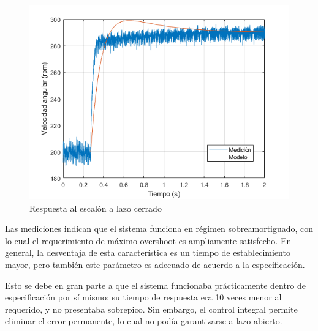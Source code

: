 \documentclass{article}
\begin{document}
\begin{figure}[ht]
	\centering
	\includegraphics[scale=0.75]{imgs/lazocerrado.png}
	\caption{Respuesta al escal\'on a lazo cerrado}
	\label{fig:lazocerrado}
\end{figure}

Las mediciones indican que el sistema funciona en r\'egimen sobreamortiguado, con lo cual el requerimiento de m\'aximo overshoot es ampliamente satisfecho. En general, la desventaja de esta caracter\'istica es un tiempo de establecimiento mayor, pero tambi\'en este par\'ametro es adecuado de acuerdo a la especificaci\'on.

Esto se debe en gran parte a que el sistema funcionaba pr\'acticamente dentro de especificaci\'on por s\'i mismo: su tiempo de respuesta era 10 veces menor al requerido, y no presentaba sobrepico. Sin embargo, el control integral permite eliminar el error permanente, lo cual no pod\'ia garantizarse a lazo abierto.
\end{document}

